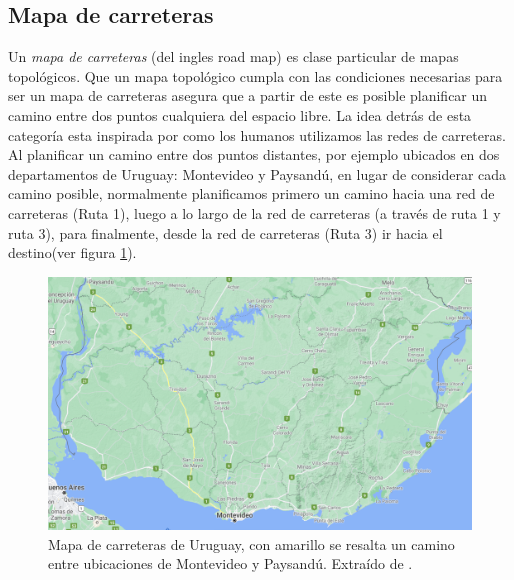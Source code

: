 
\subsection{Mapa de carreteras}\label{subsec:mapacarr}
Un \emph{mapa de carreteras} (del ingles road map) \cite{choset2005principles} es clase particular de mapas topológicos. Que un mapa topológico cumpla con las condiciones necesarias para ser un mapa de carreteras asegura que a partir de este es posible planificar un camino entre dos puntos cualquiera del espacio libre. La idea detrás de esta categoría esta inspirada por como los humanos utilizamos las redes de carreteras. Al planificar un camino entre dos puntos distantes, por ejemplo ubicados en dos departamentos de Uruguay: Montevideo y Paysandú, en lugar de considerar cada camino posible, normalmente planificamos primero un camino hacia una red de carreteras (Ruta 1), luego a lo largo de la red de carreteras (a través de ruta 1 y ruta 3), para finalmente, desde la red de carreteras (Ruta 3) ir hacia el destino(ver figura \ref{fig:ejemplovial}). 

\begin{figure}[H]
  \center
  \includegraphics[width=0.9\linewidth]{imagenes/uruguayvialMarcado.png}
  \caption{Mapa de carreteras de Uruguay, con amarillo se resalta un camino entre ubicaciones de Montevideo y Paysandú. Extraído de \cite{googlemaps}.}\label{fig:ejemplovial}
\end{figure} 

